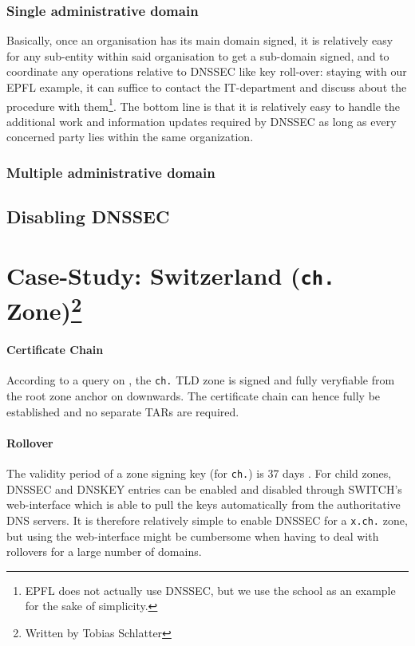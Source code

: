 \documentclass[a4paper,twocolumn]{scrartcl}
\newcommand{\wbts}{\protect\footnote{Written by Tobias Schlatter}}
\begin{document}
\subsubsection{Single administrative domain}
Basically, once an organisation has its main domain signed, it is relatively easy for any sub-entity within said organisation to get a sub-domain signed, and to coordinate any operations relative to DNSSEC like key roll-over: staying with our EPFL example, it can suffice to contact the IT-department and discuss about the procedure with them\footnote{EPFL does not actually use DNSSEC, but we use the school as an example for the sake of simplicity.}. The bottom line is that it is relatively easy to handle the additional work and information updates required by DNSSEC as long as every concerned party lies within the same organization.
\subsubsection{Multiple administrative domain}
\subsection{Disabling DNSSEC}

\section{Case-Study: Switzerland (\texttt{ch.} Zone)\wbts}
\label{sec:case-study}

\paragraph{Certificate Chain} According to a query on
\cite{secspider}, the \verb|ch.| TLD zone is signed and fully
veryfiable from the root zone anchor on downwards. The certificate
chain can hence fully be established and no separate TARs are
required.

\paragraph{Rollover} The validity period of a zone signing key (for
\verb|ch.|) is 37 days \cite{switch10}. For child zones,  DNSSEC and
DNSKEY entries can be enabled and disabled through SWITCH's
web-interface which is able to pull the keys automatically from the
authoritative DNS servers. It is therefore relatively simple to enable
DNSSEC for a \verb|x.ch.| zone, but using the web-interface might be
cumbersome when having to deal with rollovers for a large number of
domains.

\nocite{*}


\end{document}
